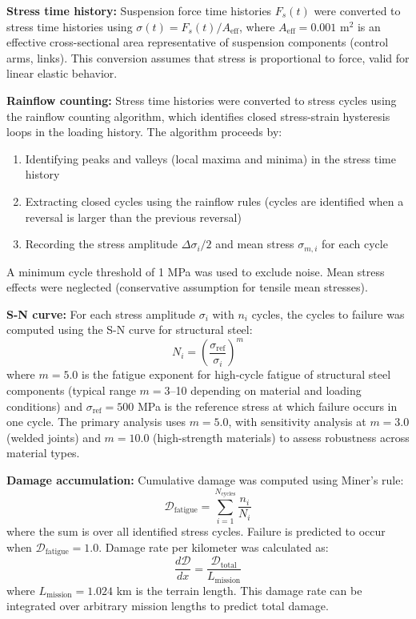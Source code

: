 \documentclass[11pt]{article}
\begin{document}
\textbf{Stress time history:} Suspension force time histories $F_s(t)$ were converted to stress time histories using $\sigma(t) = F_s(t)/A_{\text{eff}}$, where $A_{\text{eff}} = 0.001$ m$^2$ is an effective cross-sectional area representative of suspension components (control arms, links). This conversion assumes that stress is proportional to force, valid for linear elastic behavior.

\textbf{Rainflow counting:} Stress time histories were converted to stress cycles using the rainflow counting algorithm\cite{ASTM_E1049}, which identifies closed stress-strain hysteresis loops in the loading history. The algorithm proceeds by:
\begin{enumerate}
\item Identifying peaks and valleys (local maxima and minima) in the stress time history
\item Extracting closed cycles using the rainflow rules (cycles are identified when a reversal is larger than the previous reversal)
\item Recording the stress amplitude $\Delta\sigma_i/2$ and mean stress $\sigma_{m,i}$ for each cycle
\end{enumerate}
A minimum cycle threshold of 1 MPa was used to exclude noise. Mean stress effects were neglected (conservative assumption for tensile mean stresses).

\textbf{S-N curve:} For each stress amplitude $\sigma_i$ with $n_i$ cycles, the cycles to failure was computed using the S-N curve for structural steel:
\begin{equation}
N_i = \left(\frac{\sigma_{\text{ref}}}{\sigma_i}\right)^m
\end{equation}
where $m = 5.0$ is the fatigue exponent for high-cycle fatigue of structural steel components (typical range $m = 3$--10 depending on material and loading conditions) and $\sigma_{\text{ref}} = 500$ MPa is the reference stress at which failure occurs in one cycle. The primary analysis uses $m = 5.0$, with sensitivity analysis at $m = 3.0$ (welded joints) and $m = 10.0$ (high-strength materials) to assess robustness across material types.

\textbf{Damage accumulation:} Cumulative damage was computed using Miner's rule:
\begin{equation}
\mathcal{D}_{\text{fatigue}} = \sum_{i=1}^{N_{\text{cycles}}} \frac{n_i}{N_i}
\end{equation}
where the sum is over all identified stress cycles. Failure is predicted to occur when $\mathcal{D}_{\text{fatigue}} = 1.0$. Damage rate per kilometer was calculated as:
\begin{equation}
\frac{d\mathcal{D}}{dx} = \frac{\mathcal{D}_{\text{total}}}{L_{\text{mission}}}
\end{equation}
where $L_{\text{mission}} = 1.024$ km is the terrain length. This damage rate can be integrated over arbitrary mission lengths to predict total damage.
\end{document}
